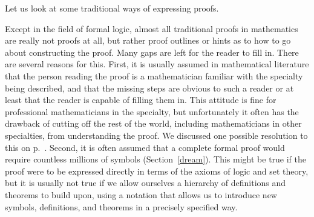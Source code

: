 Let us look at some traditional ways of expressing proofs.

Except in the field of formal logic, almost all
traditional proofs in mathematics are really not proofs at all, but rather
proof outlines or hints as to how to go about constructing the proof.  Many
gaps are left for the reader to fill in. There are
several reasons for this.  First, it is usually assumed in mathematical
literature that the person reading the proof is a mathematician familiar with
the specialty being described, and that the missing steps are obvious to such
a reader or at least that the reader is capable of filling them in.  This
attitude is fine for professional mathematicians in the specialty, but
unfortunately it often has the drawback of cutting off the rest of the world,
including mathematicians in other specialties, from understanding the proof.
We discussed one possible resolution to this on p.~\pageref{envision}.
Second, it is often assumed that a complete formal proof
would require countless millions of symbols (Section~\ref{dream}). This might
be true if the proof were to be expressed directly in terms of the axioms of
logic and set theory, but it is usually not true if we allow
ourselves a hierarchy of definitions and theorems to build
upon, using a notation that allows us to introduce new symbols, definitions,
and theorems in a precisely specified way.


